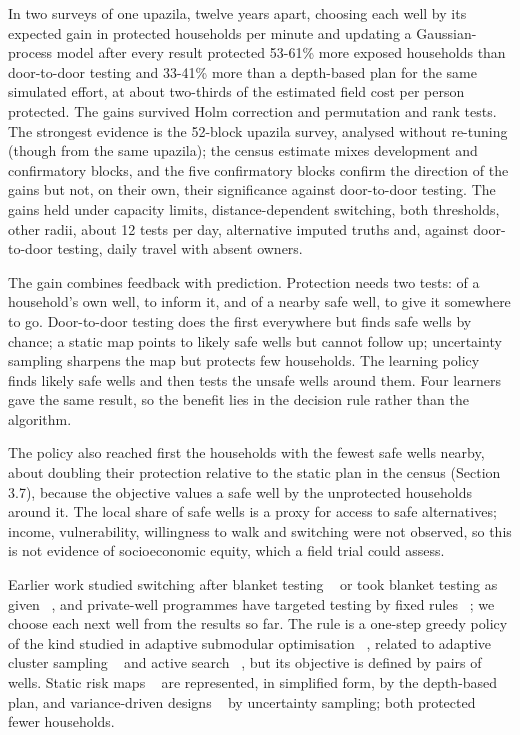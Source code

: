 \documentclass[sustainability,article,submit,pdftex,moreauthors]{Definitions/mdpi}
\begin{document}
In two surveys of one upazila, twelve years apart, choosing each well by its expected gain in protected households per minute and updating a Gaussian-process model after every result protected 53-61\% more exposed households than door-to-door testing and 33-41\% more than a depth-based plan for the same simulated effort, at about two-thirds of the estimated field cost per person protected. The gains survived Holm correction and permutation and rank tests. The strongest evidence is the 52-block upazila survey, analysed without re-tuning (though from the same upazila); the census estimate mixes development and confirmatory blocks, and the five confirmatory blocks confirm the direction of the gains but not, on their own, their significance against door-to-door testing. The gains held under capacity limits, distance-dependent switching, both thresholds, other radii, about 12 tests per day, alternative imputed truths and, against door-to-door testing, daily travel with absent owners.

The gain combines feedback with prediction. Protection needs two tests: of a household's own well, to inform it, and of a nearby safe well, to give it somewhere to go. Door-to-door testing does the first everywhere but finds safe wells by chance; a static map points to likely safe wells but cannot follow up; uncertainty sampling sharpens the map but protects few households. The learning policy finds likely safe wells and then tests the unsafe wells around them. Four learners gave the same result, so the benefit lies in the decision rule rather than the algorithm.

The policy also reached first the households with the fewest safe wells nearby, about doubling their protection relative to the static plan in the census (Section 3.7), because the objective values a safe well by the unprotected households around it. The local share of safe wells is a proxy for access to safe alternatives; income, vulnerability, willingness to walk and switching were not observed, so this is not evidence of socioeconomic equity, which a field trial could assess.

Earlier work studied switching after blanket testing ~\cite{Gelman2004,Jameel2021} or took blanket testing as given ~\cite{Jamil2019}, and private-well programmes have targeted testing by fixed rules ~\cite{Flanagan2020,ONeill2023}; we choose each next well from the results so far. The rule is a one-step greedy policy of the kind studied in adaptive submodular optimisation ~\cite{Golovin2011}, related to adaptive cluster sampling ~\cite{Thompson1990} and active search ~\cite{Garnett2012}, but its objective is defined by pairs of wells. Static risk maps ~\cite{Podgorski2020,Azad2026} are represented, in simplified form, by the depth-based plan, and variance-driven designs ~\cite{Chipeta2016,Kabaghe2017} by uncertainty sampling; both protected fewer households.
\end{document}
